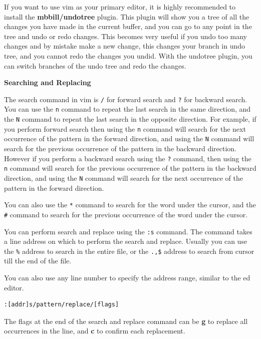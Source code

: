 \begin{remark}
  If you want to use vim as your primary editor,
  it is highly recommended to install the
  \textbf{mbbill/undotree} plugin. This plugin
  will show you a tree of all the changes you
  have made in the current buffer, and you can
  go to any point in the tree and undo or redo
  changes. This becomes very useful if you undo
  too many changes and by mistake make a new change,
  this changes your branch in undo tree, and you cannot redo
  the changes you undid. With the undotree plugin,
  you can switch branches of the undo tree and redo
  the changes.
\end{remark}

\textbf{Searching and Replacing}

The search command in vim is \texttt{/} for forward search
and \texttt{?} for backward search. You can use the \texttt{n}
command to repeat the last search in the same direction,
and the \texttt{N} command to repeat the last search in the
opposite direction. For example, if you perform forward search
then using the \texttt{n} command will search for the next
occurrence of the pattern in the forward direction, and using
the \texttt{N} command will search for the previous occurrence
of the pattern in the backward direction. However if you perform
a backward search using the \texttt{?} command, then using the
\texttt{n} command will search for the previous occurrence of the
pattern in the backward direction, and using the \texttt{N} command
will search for the next occurrence of the pattern in the forward
direction.

You can also use the \texttt{*} command to search for the word
under the cursor, and the \texttt{\#} command to search for the
previous occurrence of the word under the cursor.

You can perform search and replace using the \texttt{:s} command.
The command takes a line address on which to perform the search
and replace. Usually you can use the \texttt{\%} address to
search in the entire file, or the \texttt{.,\$} address to
search from cursor till the end of the file.

You can also use any line number to specify the address range,
similar to the ed editor.

\begin{lstlisting}
:[addr]s/pattern/replace/[flags]
\end{lstlisting}

The flags at the end of the search and replace command can be
\textbf{g} to replace all occurrences in the line, and
\textbf{c} to confirm each replacement.

